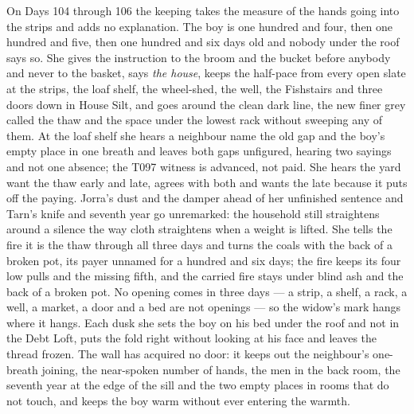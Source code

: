 \documentclass{design/chronicle}
\begin{document}
{On Days 104 through 106 the keeping takes the measure of the hands going into the strips and adds no explanation. The boy is one hundred and four, then one hundred and five, then one hundred and six days old and nobody under the roof says so. She gives the instruction to the broom and the bucket before anybody and never to the basket, says \emph{the house}, keeps the half-pace from every open slate at the strips, the loaf shelf, the wheel-shed, the well, the Fishstairs and three doors down in House Silt, and goes around the clean dark line, the new finer grey called the thaw and the space under the lowest rack without sweeping any of them. At the loaf shelf she hears a neighbour name the old gap and the boy’s empty place in one breath and leaves both gaps unfigured, hearing two sayings and not one absence; the T097 witness is advanced, not paid. She hears the yard want the thaw early and late, agrees with both and wants the late because it puts off the paying. Jorra’s dust and the damper ahead of her unfinished sentence and Tarn’s knife and seventh year go unremarked: the household still straightens around a silence the way cloth straightens when a weight is lifted. She tells the fire it is the thaw through all three days and turns the coals with the back of a broken pot, its payer unnamed for a hundred and six days; the fire keeps its four low pulls and the missing fifth, and the carried fire stays under blind ash and the back of a broken pot. No opening comes in three days --- a strip, a shelf, a rack, a well, a market, a door and a bed are not openings --- so the widow’s mark hangs where it hangs. Each dusk she sets the boy on his bed under the roof and not in the Debt Loft, puts the fold right without looking at his face and leaves the thread frozen. The wall has acquired no door: it keeps out the neighbour’s one-breath joining, the near-spoken number of hands, the men in the back room, the seventh year at the edge of the sill and the two empty places in rooms that do not touch, and keeps the boy warm without ever entering the warmth.

}
\end{document}
